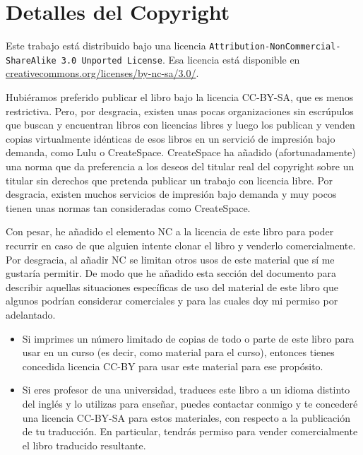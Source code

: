 
\chapter{Detalles del Copyright}

Este trabajo está distribuido bajo una licencia
{\tt Attribution-NonCommercial-ShareAlike 3.0 Unported License}.
Esa licencia está
disponible en
\url{creativecommons.org/licenses/by-nc-sa/3.0/}.  

Hubiéramos preferido publicar el libro bajo la licencia
CC-BY-SA, que es menos restrictiva. Pero, por desgracia, existen
unas pocas organizaciones sin escrúpulos
que buscan y encuentran libros con licencias libres
y luego los publican y venden copias virtualmente idénticas de esos libros
en un servició de impresión bajo demanda, como Lulu o CreateSpace. CreateSpace
ha añadido (afortunadamente) una norma que da preferencia a los deseos del titular
real del copyright sobre un titular sin derechos que pretenda
publicar un trabajo con licencia libre. Por desgracia, existen muchos
servicios de impresión bajo demanda y muy pocos tienen unas normas tan
consideradas como CreateSpace.

Con pesar, he añadido el elemento NC a la licencia
de este libro para poder recurrir en caso de que alguien intente clonar el
libro y venderlo comercialmente. Por desgracia, al añadir NC se limitan otros
usos de este material que sí me gustaría permitir. De modo que he añadido esta
sección del documento para describir aquellas situaciones específicas
de uso del material de este libro que algunos podrían considerar comerciales
y para las cuales doy mi permiso por adelantado.

\begin{itemize}
\item Si imprimes un número limitado de copias de todo o parte de
este libro para usar en un curso (es decir, como material para el curso),
entonces tienes concedida licencia CC-BY para usar este material para ese propósito.

\item Si eres profesor de una universidad, traduces este libro
a un idioma distinto del inglés y lo utilizas para enseñar, puedes
contactar conmigo y te concederé una licencia CC-BY-SA
para estos materiales, con respecto a la publicación de tu traducción.
En particular, tendrás permiso para
vender comercialmente el libro traducido resultante.
\end{itemize}

